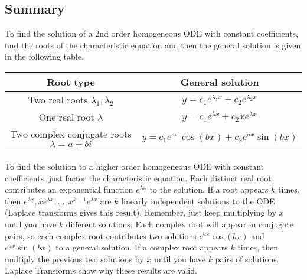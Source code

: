 
\subsection{Summary}
To find the solution of a 2nd order homogeneous ODE with constant coefficients, find the roots of the characteristic equation and then the general solution is given in the following table.
\begin{center}
\begin{tabular}{|c|c|}
\hline
Root type& General solution \\\hline
Two real roots $\lambda_1,\lambda_2$ & $y=c_1e^{\lambda_1 x}+c_2e^{\lambda_2 x}$\\ \hline
One real root $\lambda$ & $y=c_1e^{\lambda x}+c_2xe^{\lambda x}$\\ \hline
Two complex conjugate roots $\lambda=a\pm b i$ & $y=c_1e^{a x}\cos(b x)+c_2e^{a x}\sin(b x)$\\\hline
\end{tabular}
\end{center}

To find the solution to a higher order homogeneous ODE with constant coefficients, just factor the characteristic equation. Each distinct real root contributes an exponential function $e^{\lambda x}$ to the solution. If a root appears $k$ times, then $e^{\lambda x},xe^{\lambda x},\ldots, x^{k-1}e^{\lambda x}$ are $k$ linearly independent solutions to the ODE (Laplace transforms gives this result). Remember, just keep multiplying by $x$ until you have $k$ different solutions. Each complex root will appear in conjugate pairs, so each complex root contributes two solutions $e^{a x}\cos(b x)$ and $e^{a x}\sin(b x)$ to a general solution. If a complex root appears $k$ times, then multiply the previous two solutions by $x$ until you have $k$ pairs of solutions. Laplace Transforms show why these results are valid. 

